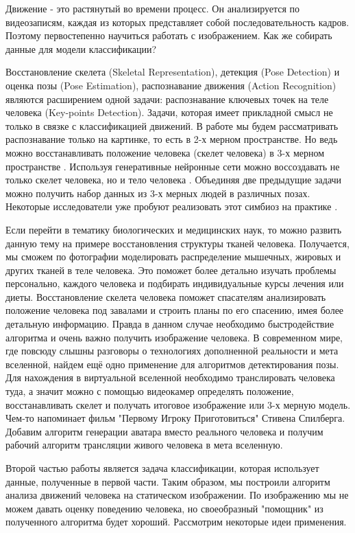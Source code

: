 \hfill \break
Движение - это растянутый во времени процесс. Он анализируется по видеозаписям, каждая из которых представляет собой последовательность кадров. Поэтому первостепенно научиться работать с изображением. Как же собирать данные для модели классификации?

Восстановление скелета (Skeletal Representation), детекция (Pose Detection) и оценка позы (Pose Estimation), распознавание движения (Action Recognition) являются расширением одной задачи: распознавание ключевых точек на теле человека (Key-points Detection). Задачи, которая имеет прикладной смысл не только в связке с классификацией движений. В работе мы будем рассматривать распознавание только на картинке, то есть в 2-х мерном пространстве. Но ведь можно восстанавливать положение человека (скелет человека) в 3-х мерном пространстве \cite{WANG2021103225} \cite{8100086}. Используя генеративные нейронные сети можно воссоздавать не только скелет человека, но и тело человека \cite{Zhang_2017_CVPR}. Объединяя две предыдущие задачи можно получить набор данных из 3-х мерных людей в различных позах. Некоторые исследователи уже пробуют реализовать этот симбиоз на практике \cite{varol17_surreal}.

Если перейти в тематику биологических и медицинских наук, то можно развить данную тему на примере восстановления структуры тканей человека. Получается, мы сможем по фотографии моделировать распределение мышечных, жировых и других тканей в теле человека. Это поможет более детально изучать проблемы персонально, каждого человека и подбирать индивидуальные курсы лечения или диеты.
Восстановление скелета человека поможет спасателям анализировать положение человека под завалами и строить планы по его спасению, имея более детальную информацию. Правда в данном случае необходимо быстродействие алгоритма и очень важно получить изображение человека.
В современном мире, где повсюду слышны разговоры о технологиях дополненной реальности и мета вселенной, найдем ещё одно применение для алгоритмов детектирования позы. Для нахождения в виртуальной вселенной необходимо транслировать человека туда, а значит можно с помощью видеокамер определять положение, восстанавливать скелет и получать итоговое изображение или 3-х мерную модель. Чем-то напоминает фильм "Первому Игроку Приготовиться"{} Стивена Спилберга. Добавим алгоритм генерации аватара вместо реального человека и получим рабочий алгоритм трансляции живого человека в мета вселенную.

\hfill \break
Второй частью работы является задача классификации, которая использует данные, полученные в первой части. Таким образом, мы построили алгоритм анализа движений человека на статическом изображении. По изображению мы не можем давать оценку поведению человека, но своеобразный "помощник"{} из полученного алгоритма будет хороший. Рассмотрим некоторые идеи применения.

